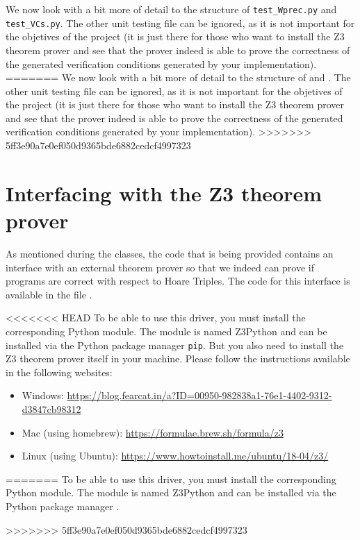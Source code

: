 \documentclass[11pt]{article}
\begin{document}
We now look with a bit more of detail to the structure of \texttt{test\_Wprec.py} and \texttt{test\_VCs.py}. The other unit testing file can be ignored, as it is not important for the objetives of the project (it is just there for those who want to install the Z3 theorem prover and see that the prover indeed is able to prove the correctness of the generated verification conditions generated by your implementation).
=======
We now look with a bit more of detail to the structure of  and . The other unit testing file can be ignored, as it is not important for the objetives of the project (it is just there for those who want to install the Z3 theorem prover and see that the prover indeed is able to prove the correctness of the generated verification conditions generated by your implementation).
>>>>>>> 5ff3e90a7e0ef050d9365bde6882cedcf4997323

\section*{Interfacing with the Z3 theorem prover}  

As mentioned during the classes, the code that is being provided contains an interface with an external theorem prover so that we indeed can prove if programs are correct with respect to Hoare Triples. The code for this interface is available in the file .

<<<<<<< HEAD
To be able to use this driver, you must install the corresponding Python module. The module is named Z3Python and can be installed via the Python package manager \texttt{pip}. But you also need to install the Z3 theorem prover itself in your machine. Please follow the instructions available in the following websites:
\begin{itemize}
  \item Windows: \url{https://blog.fearcat.in/a?ID=00950-982838a1-76e1-4402-9312-d3847cb98312}
  \item Mac (using homebrew): \url{https://formulae.brew.sh/formula/z3}
  \item Linux (using Ubuntu): \url{https://www.howtoinstall.me/ubuntu/18-04/z3/} 
\end{itemize}
=======
To be able to use this driver, you must install the corresponding Python module. The module is named Z3Python and can be installed via the Python package manager .

>>>>>>> 5ff3e90a7e0ef050d9365bde6882cedcf4997323
\end{document}
